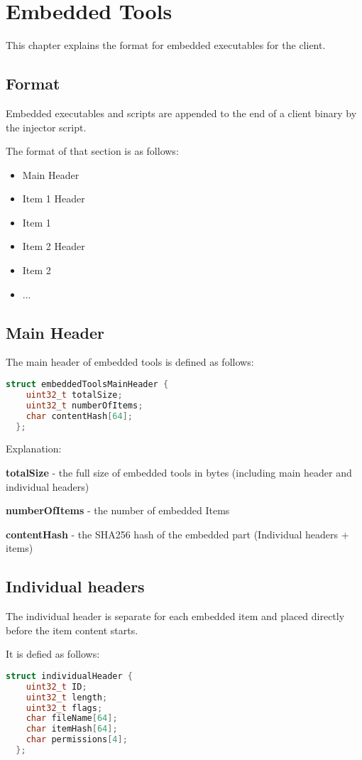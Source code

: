 \chapter{Embedded Tools}
\label{chapt-embeddedTools}
This chapter explains the format for embedded executables for the client.

\section{Format}
Embedded executables and scripts are appended to the end of a client binary by the injector script.

The format of that section is as follows:
\begin{itemize}
  \item Main Header
  \item Item 1 Header
  \item Item 1
  \item Item 2 Header
  \item Item 2
  \item ...
\end{itemize}
\section{Main Header}
The main header of embedded tools is defined as follows:
\begin{lstlisting}[language=C++]
  struct embeddedToolsMainHeader {
    uint32_t totalSize;
    uint32_t numberOfItems;
    char contentHash[64];
  };
\end{lstlisting}

Explanation:

\textbf{totalSize} - the full size of embedded tools in bytes (including main header and individual headers)

\textbf{numberOfItems} - the number of embedded Items

\textbf{contentHash} - the SHA256 hash of the embedded part (Individual headers + items)

\section{Individual headers}

The individual header is separate for each embedded item and placed directly before the item content starts.

It is defied as follows:
\begin{lstlisting}[language=C++]
  struct individualHeader {
    uint32_t ID;
    uint32_t length;
    uint32_t flags;
    char fileName[64];
    char itemHash[64];
    char permissions[4];
  };
\end{lstlisting}


